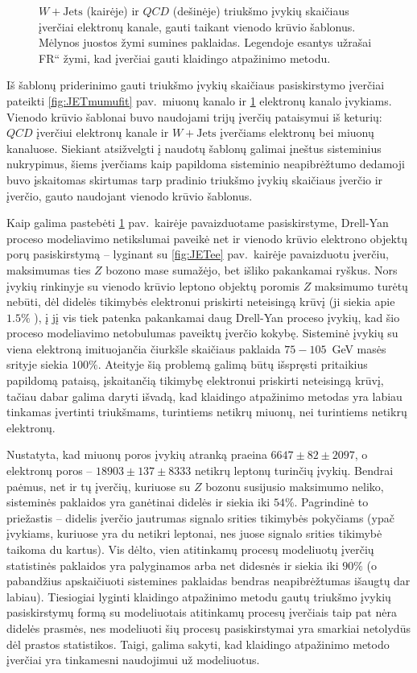 \documentclass[a4paper, 12pt, oneside]{article}
\newcommand{\WJets}{W\! +\!\mathrm{Jets}}
\newcommand{\ltq}[1]{{\quotedblbase{}#1\textquotedblleft{}}}
\newcommand{\QCD}{QC\! D}
\newlength\q
\begin{document}
\begin{figure}[b!]
	\caption{\label{fig:JETeefit}
		$\WJets$ (kairėje) ir $\QCD$ (dešinėje) triukšmo įvykių skaičiaus įverčiai elektronų kanale, gauti taikant vienodo krūvio šablonus.
		Mėlynos juostos žymi sumines paklaidas.
		Legendoje esantys užrašai \ltq{FR} žymi, kad įverčiai gauti klaidingo atpažinimo metodu.
	}	
\end{figure}

Iš šablonų priderinimo gauti triukšmo įvykių skaičiaus pasiskirstymo įverčiai pateikti \ref{fig:JETmumufit} pav.\ miuonų kanalo
ir \ref{fig:JETeefit} elektronų kanalo įvykiams.
Vienodo krūvio šablonai buvo naudojami trijų įverčių pataisymui iš keturių: $\QCD$ įverčiui elektronų kanale ir $\WJets$ įverčiams
elektronų bei miuonų kanaluose.
Siekiant atsižvelgti į naudotų šablonų galimai įneštus sisteminius nukrypimus, šiems įverčiams kaip papildoma sisteminio neapibrėžtumo
dedamoji buvo įskaitomas skirtumas tarp pradinio triukšmo įvykių skaičiaus įverčio ir įverčio, gauto naudojant vienodo krūvio
šablonus.

Kaip galima pastebėti \ref{fig:JETeefit} pav.\ kairėje pavaizduotame pasiskirstyme, Drell-Yan proceso modeliavimo
netikslumai paveikė net ir vienodo krūvio elektrono objektų porų pasiskirstymą -- lyginant su \ref{fig:JETee} pav.\ kairėje
pavaizduotu įverčiu, maksimumas ties $Z$ bozono mase sumažėjo, bet išliko pakankamai ryškus.
Nors įvykių rinkinyje su vienodo krūvio leptono objektų poromis $Z$ maksimumo turėtų nebūti, dėl didelės tikimybės elektronui
priskirti neteisingą krūvį (ji siekia apie $1.5\%$ \cite{EleID}), į jį vis tiek patenka pakankamai daug Drell-Yan proceso įvykių,
kad šio proceso modeliavimo netobulumas paveiktų įverčio kokybę.
Sisteminė įvykių su viena elektroną imituojančia čiurkšle skaičiaus paklaida $75-105$~GeV masės srityje siekia $100\%$.
Ateityje šią problemą galimą būtų išspręsti pritaikius papildomą pataisą, įskaitančią tikimybę elektronui priskirti neteisingą krūvį,
tačiau dabar galima daryti išvadą, kad klaidingo atpažinimo metodas yra labiau tinkamas įvertinti triukšmams, turintiems netikrų
miuonų, nei turintiems netikrų elektronų.

Nustatyta, kad miuonų poros įvykių atranką praeina $6647\pm 82 \pm 2097$, o elektronų poros -- $18903\pm 137\pm 8333$
netikrų leptonų turinčių įvykių.
Bendrai paėmus, net ir tų įverčių, kuriuose su $Z$ bozonu susijusio maksimumo neliko, sisteminės paklaidos yra ganėtinai didelės
ir siekia iki $54\%$.
Pagrindinė to priežastis -- didelis įverčio jautrumas signalo srities tikimybės pokyčiams (ypač įvykiams, kuriuose yra
du netikri leptonai, nes juose signalo srities tikimybė taikoma du kartus).
Vis dėlto, vien atitinkamų procesų modeliuotų įverčių statistinės paklaidos yra palyginamos arba net didesnės ir
siekia iki $90\%$ (o pabandžius apskaičiuoti sistemines paklaidas bendras neapibrėžtumas išaugtų dar labiau).
Tiesiogiai lyginti klaidingo atpažinimo metodu gautų triukšmo įvykių pasiskirstymų formą su modeliuotais atitinkamų procesų įverčiais
taip pat nėra didelės prasmės, nes modeliuoti šių procesų pasiskirstymai yra smarkiai netolydūs dėl prastos statistikos.
Taigi, galima sakyti, kad klaidingo atpažinimo metodo įverčiai yra tinkamesni naudojimui už modeliuotus.
\end{document}
